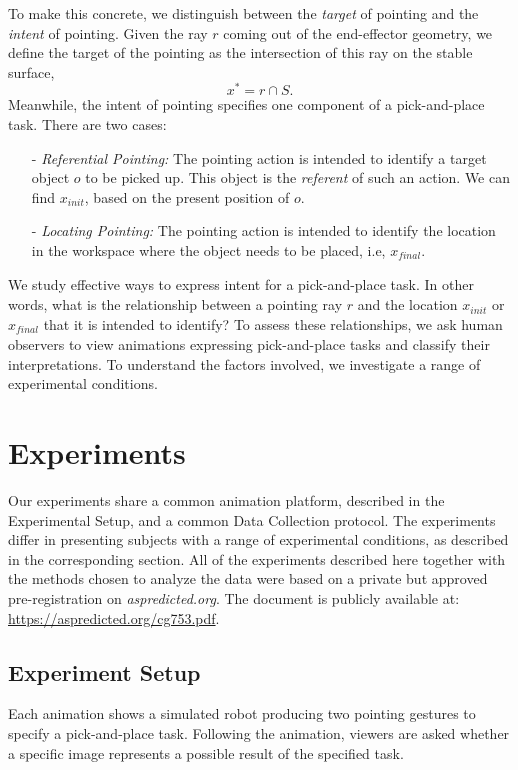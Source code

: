 \documentclass[letterpaper]{article} %
\newcommand{\xinit}{\ensuremath{x_{\textit{init}}}}
\newcommand{\xfinal}{\ensuremath{x_{\textit{final}}}}
\begin{document}
To make this concrete, we distinguish between the \emph{target} of pointing and the \emph{intent} of pointing. Given the ray $r$ coming out of the end-effector geometry, we define the target of the pointing as the intersection of this ray on the stable surface, $$x^*= r\cap S.$$ Meanwhile, the intent of pointing specifies one component of a pick-and-place task.  There are two cases:
\begin{itemize}
    \item [-] \textit{Referential Pointing:} The pointing action is intended to identify a target object $o$ to be picked up. This object is the \textit{referent} of such an action. We can find $\xinit$, based on the present position of $o$.
    \item [-] \textit{Locating Pointing:} The pointing action is intended to identify the location in the workspace where the object needs to be placed, i.e, $\xfinal$.
\end{itemize}


We study effective ways to express intent for a pick-and-place task. In other words, what is the relationship between a pointing ray $r$ and the location $\xinit$ or $\xfinal$ that it is intended to identify?  To assess these relationships, we ask human observers to view animations expressing pick-and-place tasks and classify their interpretations.  To understand the factors involved, we investigate a range of experimental conditions.



\section{Experiments}
\label{experiments}


Our experiments share a common animation platform, described in the Experimental Setup, and a common Data Collection protocol.  The experiments differ in presenting subjects with a range of experimental conditions, as described in the corresponding section.  All of the experiments described here together with the methods chosen to analyze the data were based on a private but approved pre-registration on \textit{aspredicted.org}. The document is publicly available at: \url{https://aspredicted.org/cg753.pdf}.

\subsection{Experiment Setup}
Each animation shows a simulated robot producing two pointing gestures to specify a pick-and-place task.  Following the animation, viewers are asked whether a specific image represents a possible result of the specified task.\\
\end{document}
